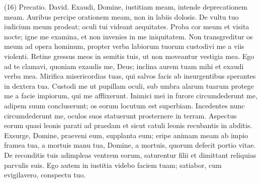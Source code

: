 \begin{biblechapter}  (16) 
\verse  Precatio. David. Exaudi, Domine, iustitiam meam, intende deprecationem meam. Auribus percipe orationem meam, non in labiis dolosis. 
\verse De vultu tuo iudicium meum prodeat; oculi tui videant aequitates. 
\verse Proba cor meum et visita nocte; igne me examina, et non invenies in me iniquitatem. 
\verse Non transgreditur os meum ad opera hominum, propter verba labiorum tuorum custodivi me a viis violenti. 
\verse Retine gressus meos in semitis tuis, ut non moveantur vestigia mea. 
\verse Ego ad te clamavi, quoniam exaudis me, Deus; inclina aurem tuam mihi et exaudi verba mea. 
\verse Mirifica misericordias tuas, qui salvos facis ab insurgentibus sperantes in dextera tua. 
\verse Custodi me ut pupillam oculi, sub umbra alarum tuarum protege me 
\verse a facie impiorum, qui me afflixerunt. Inimici mei in furore circumdederunt me, 
\verse adipem suum concluserunt; os eorum locutum est superbiam. 
\verse Incedentes nunc circumdederunt me, oculos suos statuerunt prosternere in terram. 
\verse Aspectus eorum quasi leonis parati ad praedam et sicut catuli leonis recubantis in abditis. 
\verse Exsurge, Domine, praeveni eum, supplanta eum; eripe animam meam ab impio framea tua, 
\verse a mortuis manu tua, Domine, a mortuis, quorum defecit portio vitae. De reconditis tuis adimpleas ventrem eorum, saturentur filii et dimittant reliquias parvulis suis. 
\verse Ego autem in iustitia videbo faciem tuam; satiabor, cum evigilavero, conspectu tuo. 
\end{biblechapter}

